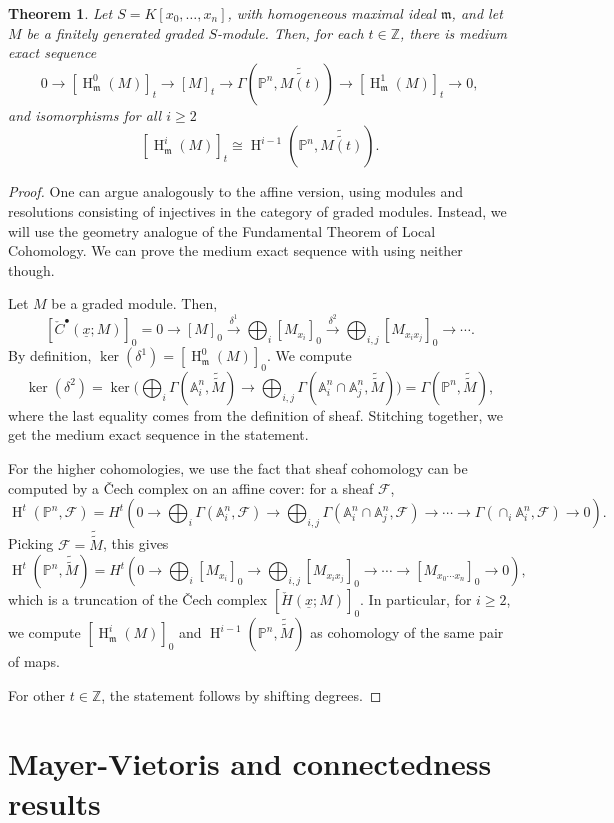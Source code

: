 \documentclass[11pt]{book}
\newtheorem{theorem}{Theorem}[chapter]
\numberwithin{equation}{section}
\numberwithin{theorem}{chapter}
\theoremstyle{definition}
\newtheorem*{basic properties}{Basic Properties}
\newtheorem*{Important Remark}{Important Remark}
\theoremstyle{remark}
\newcommand{\ZZ}{\mathbb{Z}}
\newcommand{\PP}{\mathbb{P}}
\renewcommand{\AA}{\mathbb{A}}
\newcommand{\m}{\mathfrak{m}}
\newcommand{\cF}{\mathcal{F}}
\renewcommand{\ker}{\operatorname{ker}}
\newcommand{\dtil}[1]{\widetilde{\widetilde{#1}}}
\renewcommand{\H}{\operatorname{H}}
\begin{document}
\begin{theorem}
	Let $S=K[x_0,\dots, x_n]$, with homogeneous maximal ideal $\m$, and let $M$ be a finitely generated graded $S$-module. Then, for each $t\in \ZZ$, there is medium exact sequence
	\[ 0\to [\H^0_{\m}(M)]_t \to [M]_t \to \Gamma(\PP^n,\dtil{M(t)}) \to [\H^1_\m(M)]_t \to 0, \]
	and isomorphisms for all $i\geq 2$
	\[ [\H^{i}_{\m}(M)]_t \cong \H^{i-1}(\PP^n,\dtil{M(t)}).\]
\end{theorem}
\begin{proof}
	One can argue analogously to the affine version, using modules and resolutions consisting of injectives in the category of graded modules. Instead, we will use the geometry analogue of the Fundamental Theorem of Local Cohomology. We can prove the medium exact sequence with using neither though.
	
	Let $M$ be a graded module. Then, 
	\[ [\check{C}^\bullet(\underline{x};M)]_0 = 0 \to [M]_0 \stackrel{\delta^1}{\longrightarrow} \bigoplus_i [M_{x_i}]_0 \stackrel{\delta^2}{\longrightarrow} \bigoplus_{i,j} [M_{x_i x_j}]_0 \to \cdots. \]
	By definition, $\ker(\delta^1)=[\H^0_\m(M)]_0$. We compute
	\[\ker(\delta^2)=\ker\Big( \bigoplus_i \Gamma(\AA^n_i,\dtil{M}) \to \bigoplus_{i,j} \Gamma(\AA^n_i \cap \AA^n_j,\dtil{M}) \Big) = \Gamma(\PP^n,\dtil{M}) ,\]
	where the last equality comes from the definition of sheaf. Stitching together, we get the medium exact sequence in the statement.
	
	For the higher cohomologies, we use the fact that sheaf cohomology can be computed by a \v Cech complex on an affine cover: for a sheaf $\cF$,
	\[ \H^t(\PP^n, \cF) = H^t \left( 0 \to \bigoplus_i \Gamma(\AA^n_i, \cF) \to \bigoplus_{i,j}\Gamma(\AA^n_i \cap \AA^n_j,\cF) \to \cdots \to \Gamma(\cap_i \AA^n_i,\cF) \to 0 \right). \]
	Picking $\cF=\dtil{M}$, this gives
	\[\H^t(\PP^n, \dtil{M}) = H^t \left( 0 \to \bigoplus_i [M_{x_i}]_0 \to \bigoplus_{i,j} [M_{x_i x_j}]_0 \to \cdots \to [M_{x_0\cdots x_n}]_0 \to 0 \right),\]
	which is a truncation of the \v Cech complex $[\check{H}(\underline{x};M)]_0$. In particular, for $i\geq 2$, we compute $[\H^{i}_{\m}(M)]_0$ and $\H^{i-1}(\PP^n,\dtil{M})$ as cohomology of the same pair of maps.
	
	For other $t\in \ZZ$, the statement follows by shifting degrees.
\end{proof}




\chapter{Mayer-Vietoris and connectedness results}
\end{document}
